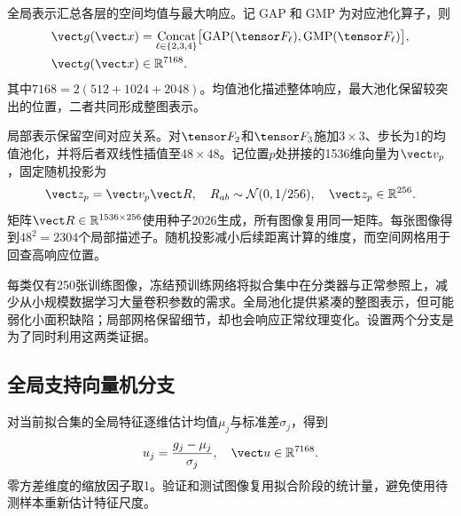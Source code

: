 全局表示汇总各层的空间均值与最大响应。记$\operatorname{GAP}$和$\operatorname{GMP}$为对应池化算子，则
\begin{equation}
\begin{aligned}
 \vect g(\vect x)&=\mathop{\operatorname{Concat}}_{\ell\in\{2,3,4\}}
 \bigl[\operatorname{GAP}(\tensor F_\ell),\operatorname{GMP}(\tensor F_\ell)\bigr],\\
 \vect g(\vect x)&\in\R^{7168}.
\end{aligned}
\label{eq:global}
\end{equation}
其中$7168=2(512+1024+2048)$。均值池化描述整体响应，最大池化保留较突出的位置，二者共同形成整图表示。

局部表示保留空间对应关系。对$\tensor F_2$和$\tensor F_3$施加$3\times3$、步长为1的均值池化，并将后者双线性插值至$48\times48$。记位置$p$处拼接的1536维向量为$\vect v_p$，固定随机投影为
\begin{equation}
 \vect z_p=\vect v_p\vect R,\quad
 R_{ab}\sim\mathcal N(0,1/256),\quad \vect z_p\in\R^{256}.
 \label{eq:projection}
\end{equation}
矩阵$\vect R\in\R^{1536\times256}$使用种子2026生成，所有图像复用同一矩阵。每张图像得到$48^2=2304$个局部描述子。随机投影减小后续距离计算的维度，而空间网格用于回查高响应位置。

每类仅有250张训练图像，冻结预训练网络将拟合集中在分类器与正常参照上，减少从小规模数据学习大量卷积参数的需求。全局池化提供紧凑的整图表示，但可能弱化小面积缺陷；局部网格保留细节，却也会响应正常纹理变化。设置两个分支是为了同时利用这两类证据。

\subsection{全局支持向量机分支}
对当前拟合集的全局特征逐维估计均值$\mu_j$与标准差$\sigma_j$，得到
\begin{equation}
 u_j=\frac{g_j-\mu_j}{\sigma_j},\quad \vect u\in\R^{7168}.
 \label{eq:standard}
\end{equation}
零方差维度的缩放因子取1。验证和测试图像复用拟合阶段的统计量，避免使用待测样本重新估计特征尺度。


